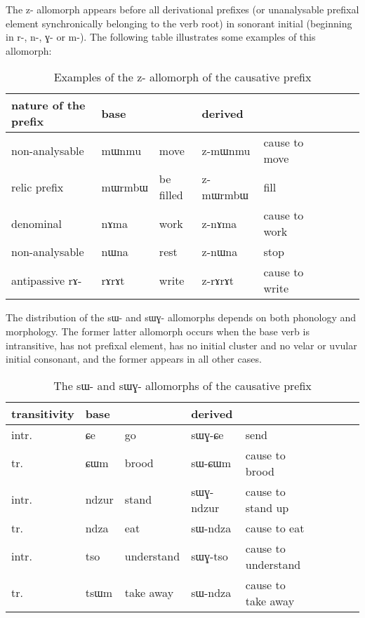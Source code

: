 \documentclass[oldfontcommands,oneside,a4paper,11pt]{memoir}
\newcommand{\ipa}[1]{{\phon #1}} %
\begin{document}
The \ipa{z-} allomorph appears before all derivational prefixes (or unanalysable prefixal element synchronically belonging to the verb root) in sonorant initial (beginning in \ipa{r-}, \ipa{n-}, \ipa{ɣ-} or \ipa{m-}). The following table illustrates some examples of this allomorph:

\begin{table}[H]
\caption{Examples of the \ipa{z}- allomorph of the causative prefix}\label{tab:causative.z}
\begin{tabular}{lllllllll} \toprule
nature of the prefix & base  & &derived  \\
\midrule
non-analysable &  \ipa{mɯnmu} &move& \ipa{z-mɯnmu} &cause to move\\
relic prefix &  \ipa{mɯrmbɯ} &be filled& \ipa{z-mɯrmbɯ} &fill\\
denominal &  \ipa{nɤma} &work& \ipa{z-nɤma} &cause to work\\
non-analysable &  \ipa{nɯna} &rest& \ipa{z-nɯna} &stop\\
antipassive \ipa{rɤ-} &  \ipa{rɤrɤt} &write& \ipa{z-rɤrɤt} &cause to write\\

\bottomrule
\end{tabular}
\end{table}

The distribution of the \ipa{sɯ-} and \ipa{sɯɣ-} allomorphs depends on both phonology and morphology. The former latter allomorph occurs when the base verb is intransitive, has not prefixal element, has no initial cluster and no velar or uvular initial consonant, and the former appears in all other cases.
\begin{table}[H]
\caption{The \ipa{sɯ}- and  \ipa{sɯɣ-} allomorphs of the causative prefix}\label{tab:causative.sW}
\begin{tabular}{lllllllll} \toprule
 transitivity & base & & derived & \\
 \midrule
 intr. & \ipa{ɕe} & go & \ipa{sɯɣ-ɕe} & send \\
  tr. & \ipa{ɕɯm} & brood & \ipa{sɯ-ɕɯm} & cause to brood \\
  intr. & \ipa{ndzur} & stand & \ipa{sɯɣ-ndzur} & cause to stand up \\
  tr. & \ipa{ndza} & eat & \ipa{sɯ-ndza} & cause to eat \\ 
    intr. & \ipa{tso} & understand & \ipa{sɯɣ-tso} & cause to understand \\
  tr. & \ipa{tsɯm} & take away & \ipa{sɯ-ndza} & cause to take away \\ 
 \bottomrule
\end{tabular}
\end{table}
 
\end{document}
